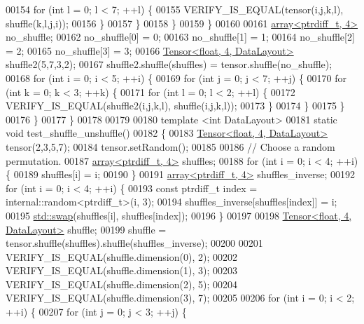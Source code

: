 \begin{DoxyCode}
00154         \textcolor{keywordflow}{for} (\textcolor{keywordtype}{int} l = 0; l < 7; ++l) \{
00155           VERIFY\_IS\_EQUAL(tensor(i,j,k,l), shuffle(k,l,j,i));
00156         \}
00157       \}
00158     \}
00159   \}
00160 
00161   \hyperlink{class_eigen_1_1array}{array<ptrdiff\_t, 4>} no\_shuffle;
00162   no\_shuffle[0] = 0;
00163   no\_shuffle[1] = 1;
00164   no\_shuffle[2] = 2;
00165   no\_shuffle[3] = 3;
00166   \hyperlink{class_eigen_1_1_tensor}{Tensor<float, 4, DataLayout>} shuffle2(5,7,3,2);
00167   shuffle2.shuffle(shuffles) = tensor.shuffle(no\_shuffle);
00168   \textcolor{keywordflow}{for} (\textcolor{keywordtype}{int} i = 0; i < 5; ++i) \{
00169     \textcolor{keywordflow}{for} (\textcolor{keywordtype}{int} j = 0; j < 7; ++j) \{
00170       \textcolor{keywordflow}{for} (\textcolor{keywordtype}{int} k = 0; k < 3; ++k) \{
00171         \textcolor{keywordflow}{for} (\textcolor{keywordtype}{int} l = 0; l < 2; ++l) \{
00172           VERIFY\_IS\_EQUAL(shuffle2(i,j,k,l), shuffle(i,j,k,l));
00173         \}
00174       \}
00175     \}
00176   \}
00177 \}
00178 
00179 
00180 \textcolor{keyword}{template} <\textcolor{keywordtype}{int} DataLayout>
00181 \textcolor{keyword}{static} \textcolor{keywordtype}{void} test\_shuffle\_unshuffle()
00182 \{
00183   \hyperlink{class_eigen_1_1_tensor}{Tensor<float, 4, DataLayout>} tensor(2,3,5,7);
00184   tensor.setRandom();
00185 
00186   \textcolor{comment}{// Choose a random permutation.}
00187   \hyperlink{class_eigen_1_1array}{array<ptrdiff\_t, 4>} shuffles;
00188   \textcolor{keywordflow}{for} (\textcolor{keywordtype}{int} i = 0; i < 4; ++i) \{
00189     shuffles[i] = i;
00190   \}
00191   \hyperlink{class_eigen_1_1array}{array<ptrdiff\_t, 4>} shuffles\_inverse;
00192   \textcolor{keywordflow}{for} (\textcolor{keywordtype}{int} i = 0; i < 4; ++i) \{
00193     \textcolor{keyword}{const} ptrdiff\_t index = internal::random<ptrdiff\_t>(i, 3);
00194     shuffles\_inverse[shuffles[index]] = i;
00195     \hyperlink{endian_8c_a3ca5ecd34b04d6a243c054ac3a57f68d}{std::swap}(shuffles[i], shuffles[index]);
00196   \}
00197 
00198   \hyperlink{class_eigen_1_1_tensor}{Tensor<float, 4, DataLayout>} shuffle;
00199   shuffle = tensor.shuffle(shuffles).shuffle(shuffles\_inverse);
00200 
00201   VERIFY\_IS\_EQUAL(shuffle.dimension(0), 2);
00202   VERIFY\_IS\_EQUAL(shuffle.dimension(1), 3);
00203   VERIFY\_IS\_EQUAL(shuffle.dimension(2), 5);
00204   VERIFY\_IS\_EQUAL(shuffle.dimension(3), 7);
00205 
00206   \textcolor{keywordflow}{for} (\textcolor{keywordtype}{int} i = 0; i < 2; ++i) \{
00207     \textcolor{keywordflow}{for} (\textcolor{keywordtype}{int} j = 0; j < 3; ++j) \{

\end{DoxyCode}
